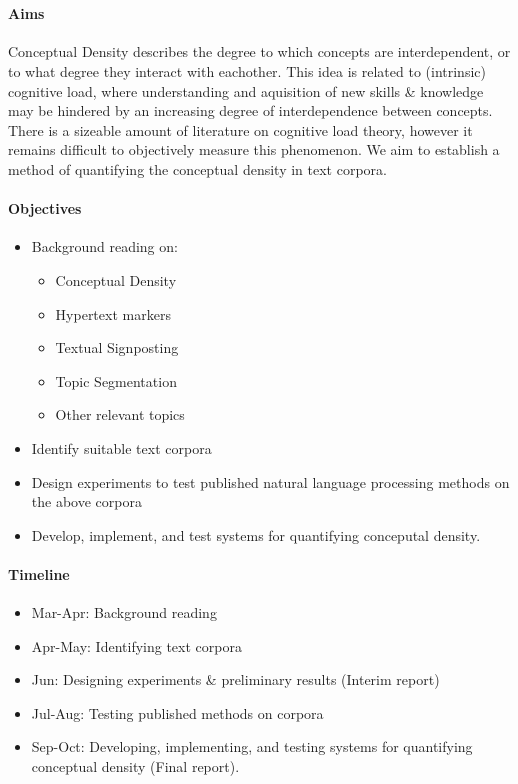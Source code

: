 \documentclass[12pt]{article}
\begin{document}
 \\

\paragraph{Aims}
Conceptual Density describes the degree to which concepts are interdependent, or to what degree they interact with eachother. This idea is related to (intrinsic) cognitive load, where understanding and aquisition of new skills \& knowledge may be hindered by an increasing degree of interdependence between concepts. There is a sizeable amount of literature on cognitive load theory, however it remains difficult to objectively measure this phenomenon. We aim to establish a method of quantifying the conceptual density in text corpora.

\paragraph{Objectives}
\begin{itemize}[noitemsep]
\item Background reading on: 

	\begin{itemize}[noitemsep]
		\item Conceptual Density
		\item Hypertext markers
		\item Textual Signposting
		\item Topic Segmentation
		\item Other relevant topics
	\end{itemize}

\item Identify suitable text corpora
\item Design experiments to test published natural language processing methods on the above corpora
\item Develop, implement, and test systems for quantifying conceputal density.
\end{itemize}

\paragraph{Timeline} 
\begin{itemize}[noitemsep]
\item Mar-Apr: Background reading
\item Apr-May: Identifying text corpora
\item Jun: Designing experiments \& preliminary results (Interim report)
\item Jul-Aug: Testing published methods on corpora
\item Sep-Oct: Developing, implementing, and testing systems for quantifying conceptual density (Final report).
\end{itemize}
\end{document}
